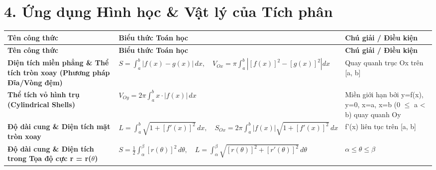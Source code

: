 \documentclass[11pt,a4paper,oneside]{book}
\begin{document}
\section*{4. Ứng dụng Hình học \& Vật lý của Tích phân}
\begin{longtable}{|p{}|p{}|p{}|}
\hline
\rowcolor{blue!10} \textbf{Tên công thức} & \textbf{Biểu thức Toán học} & \textbf{Chú giải / Điều kiện} \\ \hline
\endfirsthead
\hline
\rowcolor{blue!10} \textbf{Tên công thức} & \textbf{Biểu thức Toán học} & \textbf{Chú giải / Điều kiện} \\ \hline
\endhead
\textbf{Diện tích miền phẳng \& Thể tích tròn xoay (Phương pháp Đĩa/Vòng đệm)} & $\displaystyle S = \int_a^b |f(x) - g(x)|\,dx, \quad V_{Ox} = \pi \int_a^b \left|[f(x)]^2 - [g(x)]^2\right| dx$ & Quay quanh trục Ox trên [a, b] \\ \hline
\textbf{Thể tích vỏ hình trụ (Cylindrical Shells)} & $\displaystyle V_{Oy} = 2\pi \int_a^b x \cdot |f(x)|\,dx$ & Miền giới hạn bởi y=f(x), y=0, x=a, x=b (0 $\le$ a < b) quay quanh Oy \\ \hline
\textbf{Độ dài cung \& Diện tích mặt tròn xoay} & $\displaystyle L = \int_a^b \sqrt{1 + [f'(x)]^2}\,dx, \quad S_{Ox} = 2\pi \int_a^b |f(x)|\sqrt{1 + [f'(x)]^2}\,dx$ & f'(x) liên tục trên [a, b] \\ \hline
\textbf{Độ dài cung \& Diện tích trong Tọa độ cực r = r($\theta$)} & $\displaystyle S = \frac{1}{2}\int_\alpha^\beta [r(\theta)]^2\,d\theta, \quad L = \int_\alpha^\beta \sqrt{[r(\theta)]^2 + [r'(\theta)]^2}\,d\theta$ & $\alpha \le \theta \le \beta$ \\ \hline
\end{longtable}
\end{document}

